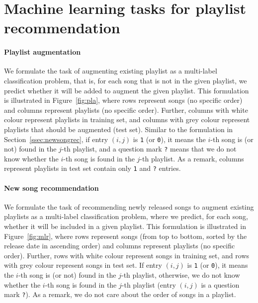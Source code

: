 \section{Machine learning tasks for playlist recommendation}

\paragraph{Playlist augmentation}
We formulate the task of augmenting existing playlist as a multi-label classification problem,
that is, for each song that is not in the given playlist, 
we predict whether it will be added to augment the given playlist.
This formulation is illustrated in Figure~\ref{fig:pla},
where rows represent songs (no specific order) and columns represent playlists (no specific order).
Further, columns with white colour represent playlists in training set, 
and columns with grey colour represent playlists that should be augmented (\ie test set).
Similar to the formulation in Section~\ref{ssec:newsongrec}, if entry $(i, j)$ is \texttt{1} (or \texttt{0}), 
it means the $i$-th song is (or not) found in the $j$-th playlist, 
and a question mark \texttt{?} means that we do not know whether the $i$-th song is found in the $j$-th playlist.
As a remark, columns represent playlists in test set contain only \texttt{1} and \texttt{?} entries.




\paragraph{New song recommendation}
We formulate the task of recommending newly released songs to augment existing playlists
as a multi-label classification problem, where we predict, for each song, 
whether it will be included in a given playlist.
This formulation is illustrated in Figure~\ref{fig:mlr},
where rows represent songs (from top to bottom, sorted by the release date in ascending order)
and columns represent playlists (no specific order).
Further, rows with white colour represent songs in training set, and rows with grey colour represent songs in test set.
If entry $(i, j)$ is \texttt{1} (or \texttt{0}), it means the $i$-th song is (or not) found in the $j$-th playlist,
otherwise, we do not know whether the $i$-th song is found in the $j$-th playlist (\ie entry $(i, j)$ is a question mark \texttt{?}).
As a remark, we do not care about the order of songs in a playlist.





